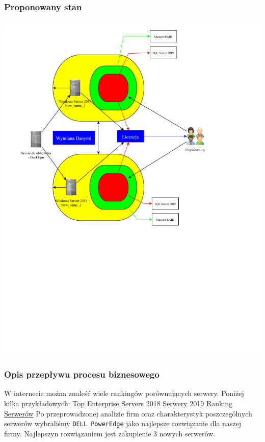 \documentclass[a4paper, 12pt]{article}
\begin{document}
			  	\subsubsection{Proponowany stan}
			  	\includegraphics[scale=0.7]{proponowany_stan} \newline
			  	\subsubsection{Opis przepływu procesu biznesowego}
			  	\hspace*{1cm} W internecie można znaleść wiele rankingów porównujących serwery. Poniżej kilka przykładowych: \newline
				\href{https://www.crn.com/slide-shows/data-center/300106536/the-10-top-enterprise-servers-of-2018-so-far.htm/1} {Top Enterprise Servers 2018} \newline
				\href{https://www.techradar.com/news/best-small-business-servers} {Serwery 2019}\newline
				\href{https://www.skapiec.pl/cat/93-serwery/ranking.html} {Ranking Serwerów}\newline
				\hspace*{1cm}Po przeprowadzonej analizie firm oraz charakterystyk poszczególnych serwerów wybraliśmy \texttt{DELL PowerEdge} jako najlepsze rozwiązanie dla naszej firmy. Najlepszyn rozwiązaniem jest zakupienie 3 nowych serwerów.
				
\end{document}
